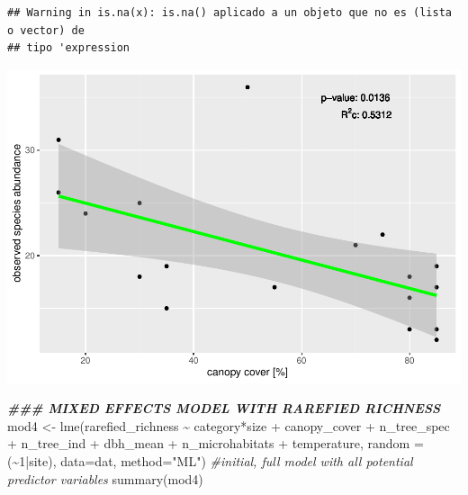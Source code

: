 \documentclass[
]{article}
\newenvironment{Shaded}{\begin{snugshade}}{\end{snugshade}}
\newcommand{\AttributeTok}[1]{\textcolor[rgb]{0.77,0.63,0.00}{#1}}
\newcommand{\CommentTok}[1]{\textcolor[rgb]{0.56,0.35,0.01}{\textit{#1}}}
\newcommand{\DecValTok}[1]{\textcolor[rgb]{0.00,0.00,0.81}{#1}}
\newcommand{\DocumentationTok}[1]{\textcolor[rgb]{0.56,0.35,0.01}{\textbf{\textit{#1}}}}
\newcommand{\FunctionTok}[1]{\textcolor[rgb]{0.00,0.00,0.00}{#1}}
\newcommand{\NormalTok}[1]{#1}
\newcommand{\OtherTok}[1]{\textcolor[rgb]{0.56,0.35,0.01}{#1}}
\newcommand{\SpecialCharTok}[1]{\textcolor[rgb]{0.00,0.00,0.00}{#1}}
\newcommand{\StringTok}[1]{\textcolor[rgb]{0.31,0.60,0.02}{#1}}
\begin{document}
\begin{verbatim}
## Warning in is.na(x): is.na() aplicado a un objeto que no es (lista o vector) de
## tipo 'expression
\end{verbatim}

\includegraphics{birdsdataanalysis_files/figure-latex/unnamed-chunk-10-2.pdf}

\begin{Shaded}
\begin{Highlighting}[]
\DocumentationTok{\#\#\# MIXED EFFECTS MODEL WITH RAREFIED RICHNESS}
\NormalTok{mod4 }\OtherTok{\textless{}{-}} \FunctionTok{lme}\NormalTok{(rarefied\_richness }\SpecialCharTok{\textasciitilde{}}\NormalTok{ category}\SpecialCharTok{*}\NormalTok{size }\SpecialCharTok{+}\NormalTok{ canopy\_cover }\SpecialCharTok{+}\NormalTok{ n\_tree\_spec }\SpecialCharTok{+}\NormalTok{ n\_tree\_ind }\SpecialCharTok{+}\NormalTok{ dbh\_mean }\SpecialCharTok{+}\NormalTok{ n\_microhabitats }\SpecialCharTok{+}\NormalTok{ temperature, }\AttributeTok{random =}\NormalTok{ (}\SpecialCharTok{\textasciitilde{}}\DecValTok{1}\SpecialCharTok{|}\NormalTok{site), }\AttributeTok{data=}\NormalTok{dat, }\AttributeTok{method=}\StringTok{"ML"}\NormalTok{) }\CommentTok{\#initial, full model with all potential predictor variables}
\FunctionTok{summary}\NormalTok{(mod4)}
\end{Highlighting}
\end{Shaded}
\end{document}
